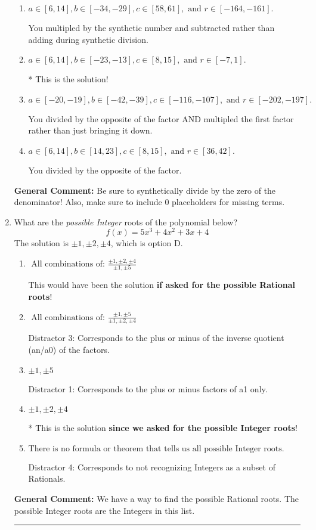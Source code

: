 \documentclass{extbook}[14pt]
\newcommand{\litem}[1]{\item #1

\rule{\textwidth}{0.4pt}}
\begin{document}
\begin{enumerate}
{\begin{enumerate}[label=\Alph*.]
 You multipled by the synthetic number rather than bringing the first factor down.
\item \( a \in [6, 14], b \in [-34, -29], c \in [58, 61], \text{ and } r \in [-164, -161]. \)

 You multipled by the synthetic number and subtracted rather than adding during synthetic division.
\item \( a \in [6, 14], b \in [-23, -13], c \in [8, 15], \text{ and } r \in [-7, 1]. \)

* This is the solution!
\item \( a \in [-20, -19], b \in [-42, -39], c \in [-116, -107], \text{ and } r \in [-202, -197]. \)

 You divided by the opposite of the factor AND multipled the first factor rather than just bringing it down.
\item \( a \in [6, 14], b \in [14, 23], c \in [8, 15], \text{ and } r \in [36, 42]. \)

 You divided by the opposite of the factor.
\end{enumerate}

\textbf{General Comment:} Be sure to synthetically divide by the zero of the denominator! Also, make sure to include 0 placeholders for missing terms.
}
\litem{
What are the \textit{possible Integer} roots of the polynomial below?
\[ f(x) = 5x^{3} +4 x^{2} +3 x + 4 \]The solution is \( \pm 1,\pm 2,\pm 4 \), which is option D.\begin{enumerate}[label=\Alph*.]
\item \( \text{ All combinations of: }\frac{\pm 1,\pm 2,\pm 4}{\pm 1,\pm 5} \)

This would have been the solution \textbf{if asked for the possible Rational roots}!
\item \( \text{ All combinations of: }\frac{\pm 1,\pm 5}{\pm 1,\pm 2,\pm 4} \)

 Distractor 3: Corresponds to the plus or minus of the inverse quotient (an/a0) of the factors. 
\item \( \pm 1,\pm 5 \)

 Distractor 1: Corresponds to the plus or minus factors of a1 only.
\item \( \pm 1,\pm 2,\pm 4 \)

* This is the solution \textbf{since we asked for the possible Integer roots}!
\item \( \text{There is no formula or theorem that tells us all possible Integer roots.} \)

 Distractor 4: Corresponds to not recognizing Integers as a subset of Rationals.
\end{enumerate}

\textbf{General Comment:} We have a way to find the possible Rational roots. The possible Integer roots are the Integers in this list.
}
\end{enumerate}
\end{document}
